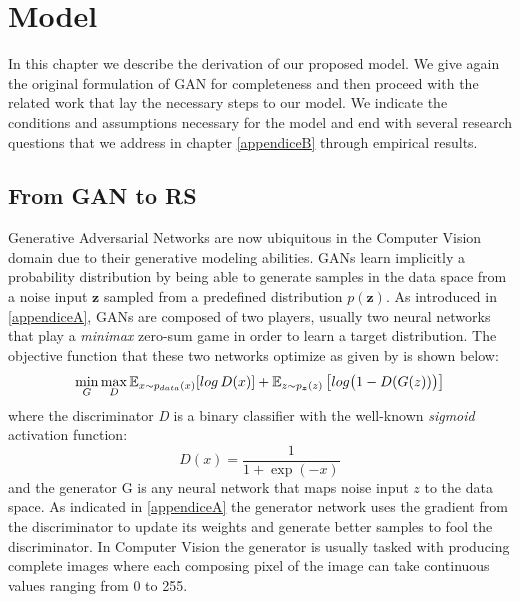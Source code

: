 \chapter{Model}
\label{model}
\thispagestyle{empty}

In this chapter we describe the derivation of our proposed model. We give again the original formulation of GAN for completeness and then proceed with the related work that lay the necessary steps to our model. We indicate the conditions and assumptions necessary for the model and end with several research questions that we address in chapter \ref{appendiceB} through empirical results.

\section{From GAN to RS}
\label{from_gan_to_rs}
Generative Adversarial Networks \cite{goodfellow2014generative} are now ubiquitous in the Computer Vision domain due to their generative modeling abilities. GANs learn implicitly a probability distribution by being able to generate samples in the data space from a noise input $\textbf{z}$ sampled from a predefined distribution $p(\textbf{z})$. As introduced in \ref{appendiceA}, GANs are composed of two players, usually two neural networks that play a \emph{minimax} zero-sum game in order to learn a target distribution. The objective function that these two networks optimize as given by \cite{goodfellow2014generative} is shown below:
\[
    \min_{G} \max_{D} \operatorname{\mathbb{E}}_{x\sim{p_{data}(x)}} [log \, D(x)] + \operatorname{\mathbb{E}}_{z\sim{p_{\boldsymbol{z}}(z)}} \big[log\big(1-D(G(z))\big)\big]
\]
where the discriminator \emph{D} is a binary classifier with the well-known \emph{sigmoid} activation function:
\[
    D(x) = \frac{1}{1 + \exp(-x)}
\]
and the generator G is any neural network that maps noise input $z$ to the data space. As indicated in \ref{appendiceA} the generator network uses the gradient from the discriminator to update its weights and generate better samples to fool the discriminator. In Computer Vision the generator is usually tasked with producing complete images where each composing pixel of the image can take continuous values ranging from 0 to 255.

